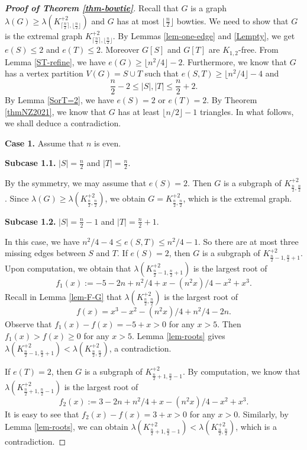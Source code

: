 \documentclass[11pt]{article}
\begin{document}
\begin{proof}[{\bf Proof of Theorem \ref{thm-bowtie}}] 
Recall 
that  $G$ is a graph 
$\lambda (G) \ge \lambda (K_{\lceil \frac{n}{2} \rceil, \lfloor \frac{n}{2} \rfloor}^{+2})$ and $G$ 
has at most $\lfloor \frac{n}{2}\rfloor$ bowties. 
We need to show that $G$ is the extremal graph $K_{\lceil \frac{n}{2} \rceil, \lfloor \frac{n}{2} \rfloor}^{+2}$. 
By Lemmas \ref{lem-one-edge} and \ref{Lempty},  
we  get $e(S) \le 2 $ and $e(T) \le 2$. Moreover $G[S]$ and $G[T]$ 
are $K_{1,2}$-free. 
From Lemma \ref{ST-refine}, 
we have $e(G)\ge \lfloor n^2/4\rfloor -2$. 
 Furthermore, 
we know that $G$ has a vertex partition $V(G)=S\cup T$ 
such that $e(S,T)\ge \lfloor n^2/4\rfloor  -4$ and 
\[  \frac{n}{2}  -2 \le |S|, |T| \le  \frac{n}{2}  +2. \]   
By Lemma \ref{SorT=2}, we have 
$e(S)=2$ or $e(T)=2$. 
By Theorem \ref{thmNZ2021}, we know that $G$ has 
at least $\lfloor n/2\rfloor -1$ triangles.  
In what follows, we shall deduce a contradiction. 


\medskip 
{\bf Case 1.} Assume that $n$ is even. 


{\bf Subcase 1.1.}  $|S|= \frac{n}{2} $ and $|T|=\frac{n}{2} $.  

By the symmetry, 
we may assume that $e(S)=2$. 
Then $G$ is a subgraph of $K_{\frac{n}{2} , \frac{n}{2}}^{+2}$. 
 Since $\lambda (G) \ge \lambda (K_{\frac{n}{2} , \frac{n}{2}}^{+2})$, we obtain $G=K_{\frac{n}{2} , \frac{n}{2}}^{+2}$, 
 which is the extremal graph. 


{\bf Subcase 1.2.}  $|S|= \frac{n}{2} -1$ and $|T|=\frac{n}{2} +1$.

In this case, 
 we have $n^2/4 -4 \le e(S,T) \le n^2/4 -1$. 
So there are at most three missing edges between 
$S$ and $T$. 
If $e(S)=2$, then 
$G$ is a subgraph of $K_{\frac{n}{2} -1, \frac{n}{2} +1}^{+2}$. 
Upon computation, we obtain that 
 $\lambda (K_{\frac{n}{2} -1, \frac{n}{2} +1}^{+2})$ 
is the largest root of 
\[  f_1(x):=-5 - 2 n + n^2/4 + x - (n^2 x)/4 - x^2 + x^3. \]
Recall in Lemma \ref{lem-F-G} that 
$ \lambda (K_{\frac{n}{2} , \frac{n}{2} }^{+2})$ is the largest root of 
\[  f(x)= x^3 - x^2 - (n^2 x)/4 + n^2/4 - 2 n. \]  
Observe that $f_1(x) - f(x)= -5+x >0$ for any $x>5$. 
Then $f_1(x) > f(x) \ge 0$ 
for any $x> 5$. 
Lemma \ref{lem-roots} gives $\lambda (K_{\frac{n}{2} -1, \frac{n}{2} +1}^{+2}) 
< \lambda (K_{\frac{n}{2} , \frac{n}{2} }^{+2})$, a contradiction. 


If $e(T)=2$, then $G$ is a subgraph of $K_{\frac{n}{2} +1, \frac{n}{2} -1}^{+2}$. 
By computation, we know that 
$\lambda (K_{\frac{n}{2} +1, \frac{n}{2} -1}^{+2})$ 
is the largest root of 
\[  f_2(x) := 3 - 2 n + n^2/4 + x - (n^2 x)/4 - x^2 + x^3.  \]
It is easy to see that $f_2(x) - f(x)= 3+x >0 $ for any $x>0$. 
Similarly, by Lemma \ref{lem-roots}, 
we can obtain $\lambda (K_{\frac{n}{2} +1, \frac{n}{2} -1}^{+2}) < \lambda (K_{\frac{n}{2} , \frac{n}{2} }^{+2})$, 
 which is a contradiction.  
 



\end{proof}
\end{document}
